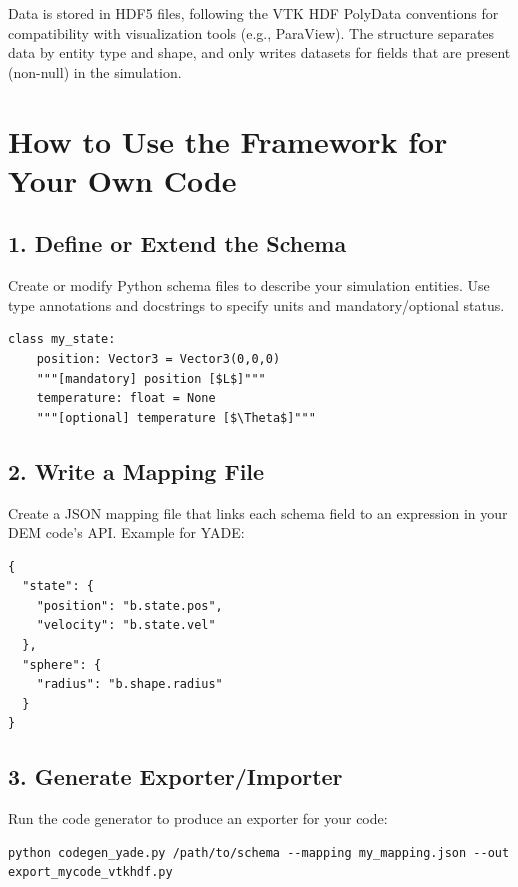 \documentclass[11pt]{article}
\begin{document}
Data is stored in HDF5 files, following the VTK HDF PolyData conventions for compatibility with visualization tools (e.g., ParaView). The structure separates data by entity type and shape, and only writes datasets for fields that are present (non-null) in the simulation.

\section{How to Use the Framework for Your Own Code}

\subsection{1. Define or Extend the Schema}

Create or modify Python schema files to describe your simulation entities. Use type annotations and docstrings to specify units and mandatory/optional status.

\begin{verbatim}
class my_state:
    position: Vector3 = Vector3(0,0,0)
    """[mandatory] position [$L$]"""
    temperature: float = None
    """[optional] temperature [$\Theta$]"""
\end{verbatim}

\subsection{2. Write a Mapping File}

Create a JSON mapping file that links each schema field to an expression in your DEM code's API. Example for YADE:

\begin{verbatim}
{
  "state": {
    "position": "b.state.pos",
    "velocity": "b.state.vel"
  },
  "sphere": {
    "radius": "b.shape.radius"
  }
}
\end{verbatim}

\subsection{3. Generate Exporter/Importer}

Run the code generator to produce an exporter for your code:

\begin{verbatim}
python codegen_yade.py /path/to/schema --mapping my_mapping.json --out export_mycode_vtkhdf.py
\end{verbatim}
\end{document}
